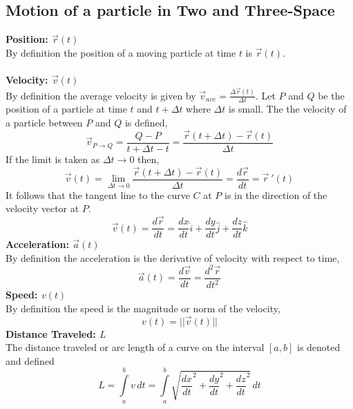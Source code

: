 \documentclass[14pt]{article}
\begin{document}
    \subsection{Motion of a particle in Two and Three-Space}
    \textbf{Position: $\vec r(t)$}\\
    By definition the position of a moving particle at time $t$ is $\vec
    r(t)$.\\\\
    \textbf{Velocity: $\vec v(t)$}\\
    By definition the average velocity is given by $\vec
    v_{ave}=\frac{\Delta\vec r(t)}{\Delta t}$. Let $P$ and $Q$ be the
    position of a particle at time $t$ and $t+\Delta t$ where $\Delta t$
    is small. The the velocity of a particle between $P$ and $Q$ is
    defined, 
    $$\vec v_{P\rightarrow Q}=\frac{Q-P}{t+\Delta t-t}=\frac{\vec
    r(t+\Delta t)-\vec r(t)}{\Delta t}$$ If the limit is taken as
    $\Delta t\rightarrow 0$ then,
    $$\vec v(t)=\lim\limits_{\Delta t\rightarrow 0}\frac{\vec r(t+\Delta
    t)-\vec r(t)}{\Delta t}=\frac{d\vec r}{dt}=\vec r\ '(t)$$ It follows
    that the tangent line to the curve $C$ at $P$ is in the direction of
    the velocity vector at $P$.
    $$\vec v(t)=\frac{d\vec r}{dt}= \frac{dx}{dt}\hat i+
    \frac{dy}{dt}\hat j +\frac{dz}{dt}\hat k$$ \textbf{Acceleration:
    $\vec a(t)$}\\
    By definition the acceleration is the derivative of velocity with
    respect to time,
    $$\vec a (t)=\frac{d\vec v}{dt}=\frac{d^2\vec r}{dt^2}$$
    \textbf{Speed: $v(t)$}\\
    By definition the speed is the magnitude or norm of the velocity,
    $$v(t)=||\vec v (t)||$$ \textbf{Distance Traveled: $L$}\\
    The distance traveled or arc length of a curve on the interval
    $[a,b]$ is denoted and defined
    $$L=\int\limits_a^bv\,
    dt=\int\limits_a^b\sqrt{\frac{dx}{dt}^2+\frac{dy}{dt}^2+\frac{dz}{dt}^2}\,
    dt$$
\end{document}
